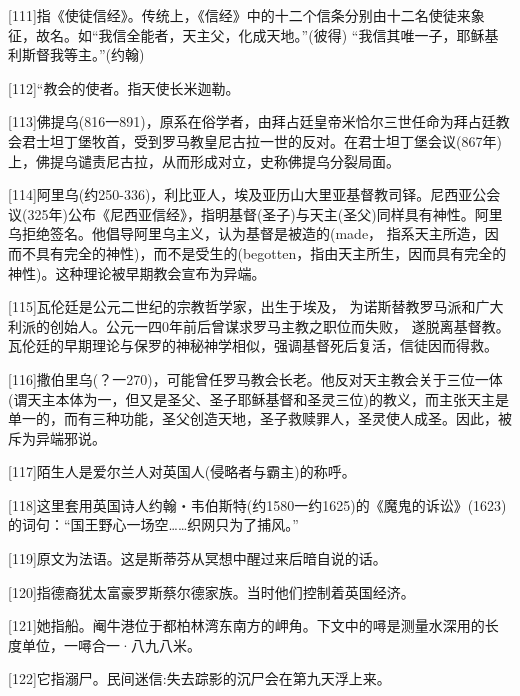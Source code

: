 \documentclass{article}
\begin{document}
[111]指《使徒信经》。传统上，《信经》中的十二个信条分别由十二名使徒来象征，故名。如“我信全能者，天主父，化成天地。”(彼得) “我信其唯一子，耶稣基利斯督我等主。”(约翰)



[112]“教会的使者。指天使长米迦勒。



[113]佛提乌(816一891)，原系在俗学者，由拜占廷皇帝米恰尔三世任命为拜占廷教会君士坦丁堡牧首，受到罗马教皇尼古拉一世的反对。在君士坦丁堡会议(867年)上，佛提乌谴责尼古拉，从而形成对立，史称佛提乌分裂局面。



[114]阿里乌(约250-336)，利比亚人，埃及亚历山大里亚基督教司铎。尼西亚公会议(325年)公布《尼西亚信经》，指明基督(圣子)与天主(圣父)同样具有神性。阿里乌拒绝签名。他倡导阿里乌主义，认为基督是被造的(made， 指系天主所造，因而不具有完全的神性)，而不是受生的(begotten，指由天主所生，因而具有完全的神性)。这种理论被早期教会宣布为异端。



[115]瓦伦廷是公元二世纪的宗教哲学家，出生于埃及， 为诺斯替教罗马派和广大利派的创始人。公元一四0年前后曾谋求罗马主教之职位而失败， 遂脱离基督教。瓦伦廷的早期理论与保罗的神秘神学相似，强调基督死后复活，信徒因而得救。



[116]撒伯里乌(？一270)，可能曾任罗马教会长老。他反对天主教会关于三位一体(谓天主本体为一，但又是圣父、圣子耶稣基督和圣灵三位)的教义，而主张天主是单一的，而有三种功能，圣父创造天地，圣子救赎罪人，圣灵使人成圣。因此，被斥为异端邪说。



[117]陌生人是爱尔兰人对英国人(侵略者与霸主)的称呼。



[118]这里套用英国诗人约翰・韦伯斯特(约1580一约1625)的《魔鬼的诉讼》(1623)的词句：“国王野心一场空……织网只为了捕风。”



[119]原文为法语。这是斯蒂芬从冥想中醒过来后暗自说的话。



[120]指德裔犹太富豪罗斯蔡尔德家族。当时他们控制着英国经济。



[121]她指船。阉牛港位于都柏林湾东南方的岬角。下文中的噚是测量水深用的长度单位，一噚合一·八九八米。



[122]它指溺尸。民间迷信:失去踪影的沉尸会在第九天浮上来。
\end{document}
